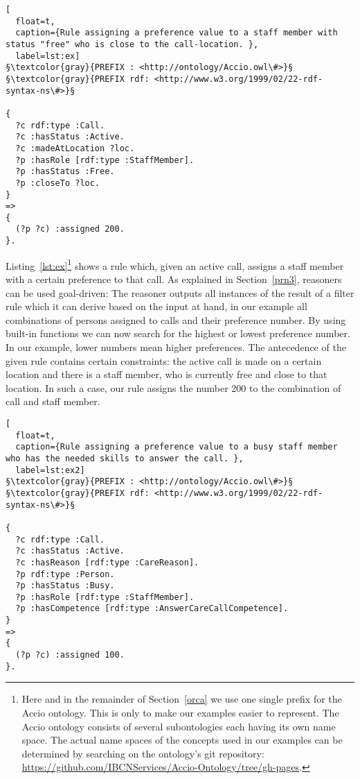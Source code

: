  \begin{lstlisting}[
  float=t,
  caption={Rule assigning a preference value to a staff member with status "free" who is close to the call-location. },
  label=lst:ex]
§\textcolor{gray}{PREFIX : <http://ontology/Accio.owl\#>}§
§\textcolor{gray}{PREFIX rdf: <http://www.w3.org/1999/02/22-rdf-syntax-ns\#>}§

{
  ?c rdf:type :Call.
  ?c :hasStatus :Active. 
  ?c :madeAtLocation ?loc. 
  ?p :hasRole [rdf:type :StaffMember].
  ?p :hasStatus :Free.
  ?p :closeTo ?loc.
}
=>
{
  (?p ?c) :assigned 200.
}.
\end{lstlisting}
 
Listing~\ref{lst:ex}\footnote{Here and in the remainder of Section~\ref{orca} we use one single prefix for the Accio ontology. This is only to make our examples easier to represent. The Accio ontology consists of several subontologies
each having its own name space. The actual name spaces of the concepts used in our examples can be determined by searching on the ontology's git repository: \url{https://github.com/IBCNServices/Accio-Ontology/tree/gh-pages}.} shows a rule which, given an active call, assigns a staff member with a certain preference to that call. 
As explained in Section~\ref{prn3}, \nthree reasoners can be used goal-driven: The reasoner outputs all instances of the result of a filter rule which it can derive 
based on the input at hand, in our example all combinations of persons assigned to calls and their preference number. 
By using built-in functions we can now search for the highest or lowest preference number.
In our example, lower numbers mean higher preferences. The antecedence of the given rule contains certain constraints: the active call is made on a certain location and
there is a staff member, who is currently free and close to that location. In such a case, our rule assigns the number 200 to the combination of call and staff member.

\begin{lstlisting}[
  float=t,
  caption={Rule assigning a preference value to a busy staff member who has the needed skills to answer the call. },
  label=lst:ex2]
§\textcolor{gray}{PREFIX : <http://ontology/Accio.owl\#>}§
§\textcolor{gray}{PREFIX rdf: <http://www.w3.org/1999/02/22-rdf-syntax-ns\#>}§

{
  ?c rdf:type :Call.
  ?c :hasStatus :Active.
  ?c :hasReason [rdf:type :CareReason].
  ?p rdf:type :Person.
  ?p :hasStatus :Busy.
  ?p :hasRole [rdf:type :StaffMember].
  ?p :hasCompetence [rdf:type :AnswerCareCallCompetence].
}
=>
{
  (?p ?c) :assigned 100.
}.
\end{lstlisting}



